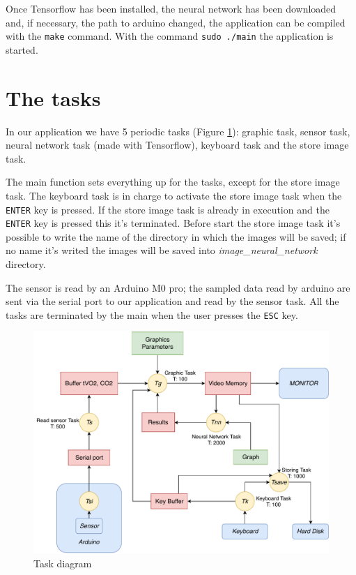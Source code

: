 \documentclass[12pt]{article}
\begin{document}
Once Tensorflow has been installed, the neural network has been downloaded
and, if necessary, the path to arduino changed, the application can be
compiled with the \texttt{make} command. With the command \texttt{sudo
./main} the application is started.

\section{The tasks}
In our application we have 5 periodic tasks (Figure \ref{tdiagram}): graphic
task, sensor task, neural network task (made with Tensorflow), keyboard task
and the store image task.

The main function sets everything up for the tasks, except for the store
image task. The keyboard task is in charge to activate the store image task
when the \texttt{ENTER} key is pressed. If the store image task is already in
execution and the \texttt{ENTER} key is pressed this it's terminated.
Before start the store image task it's possible to write the name of the
directory in which the images will be saved; if no name it's writed the
images will be saved into \textit{image\_neural\_network} directory.

The sensor is read by an Arduino M0 pro; the sampled data read by arduino
are sent via the serial port to our application and read by the sensor
task. All the tasks are terminated by the main when the user presses the
\texttt{ESC} key.

\begin{figure}[H]
    \includegraphics[width=\textwidth]{diagram.pdf}
    \caption{Task diagram}
    \label{tdiagram}
\end{figure}
\end{document}
